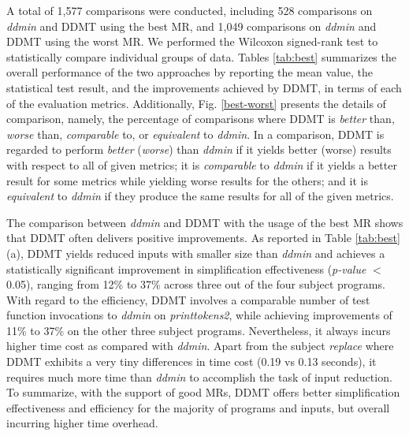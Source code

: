 A total of 1,577 comparisons were conducted, including 528 comparisons on \emph{ddmin} and DDMT using the best MR, and 1,049 comparisons on \emph{ddmin} and DDMT using the worst MR.
We performed the Wilcoxon signed-rank test \cite{riina2023} to statistically compare individual groups of data.
Tables \ref{tab:best} summarizes the overall performance of the two approaches by reporting the mean value, the statistical test result, and the improvements achieved by DDMT, in terms of each of the evaluation metrics.
Additionally, Fig. \ref{best-worst} presents the details of comparison, namely, the percentage of comparisons where DDMT is \emph{better} than, \emph{worse} than, \emph{comparable} to, or \emph{equivalent} to \emph{ddmin}.
In a comparison, DDMT is regarded to perform \emph{better} (\emph{worse}) than \emph{ddmin} if it yields better (worse) results with respect to all of given metrics;
it is \emph{comparable} to \emph{ddmin} if it yields a better result for some metrics while yielding worse results for the others;
and it is \emph{equivalent} to \emph{ddmin} if they produce the same results for all of the given metrics.




The comparison between \emph{ddmin} and DDMT with the usage of the best MR shows that DDMT often 
delivers positive improvements.
As reported in Table \ref{tab:best} (a), DDMT yields reduced inputs with smaller size than \emph{ddmin} and achieves a statistically significant improvement in simplification effectiveness (\emph{p-value} $<$ 0.05), ranging from 12\% to 37\% across three out of the four subject programs.
With regard to the efficiency, DDMT involves a comparable number of test function invocations to \emph{ddmin} on \emph{printtokens2}, while achieving improvements of 11\% to 37\% on the other three subject programs.
Nevertheless, it always incurs higher time cost as compared with \emph{ddmin}.
Apart from the subject \emph{replace} where DDMT exhibits a very tiny differences in time cost (0.19 vs 0.13 seconds), it requires much more time than \emph{ddmin} to accomplish the task of input reduction.
To summarize, with the support of good MRs, DDMT offers better simplification effectiveness and efficiency for the majority of programs and inputs, but overall incurring higher time overhead.





